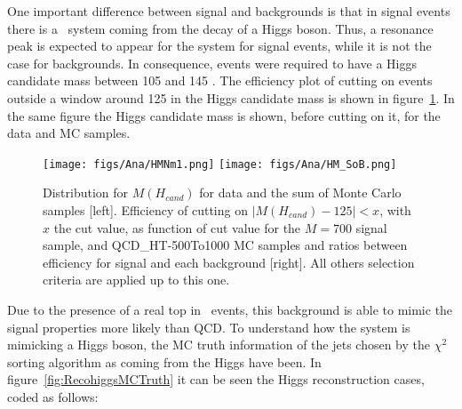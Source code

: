 One important difference between signal and backgrounds is that in signal events there is a \bbbar~system coming from the decay of a Higgs boson. Thus, a resonance peak is expected to appear for the \bbbar system for signal events, while it is not the case for backgrounds. In consequence, events were required to have a Higgs candidate mass between 105 and 145 \GeVcc. The efficiency plot of cutting on events outside a window around 125 \GeVcc in the Higgs candidate mass is shown in figure~\ref{fig:HiggsMassDMC}. In the same figure the Higgs candidate mass is shown, before cutting on it, for the data and MC samples.

\begin{figure}[!Hhtbp]
  \begin{center}
    \texttt{[image: figs/Ana/HMNm1.png]}
    \texttt{[image: figs/Ana/HM\_SoB.png]}
    \caption{Distribution for $M(H_{cand})$ for data and the sum of Monte Carlo samples [left]. Efficiency of cutting on $|M(H_{cand})-125|<x$, with $x$ the cut value, as function of cut value for the $M=700$ \GeVcc signal sample, \ttbar and QCD\_HT-500To1000 MC samples and ratios between efficiency for signal and each background [right]. All others selection criteria are applied up to this one.}
    \label{fig:HiggsMassDMC}
  \end{center}
\end{figure}

Due to the presence of a real top in \ttbar~events, this background is able to mimic the signal properties more likely than QCD. To understand how the \ttbar system is mimicking a Higgs boson, the MC truth information of the jets chosen by the $\chi^{2}$ sorting algorithm as coming from the Higgs have been. In figure~\ref{fig:RecohiggsMCTruth} it can be seen the Higgs reconstruction cases, coded as follows:


